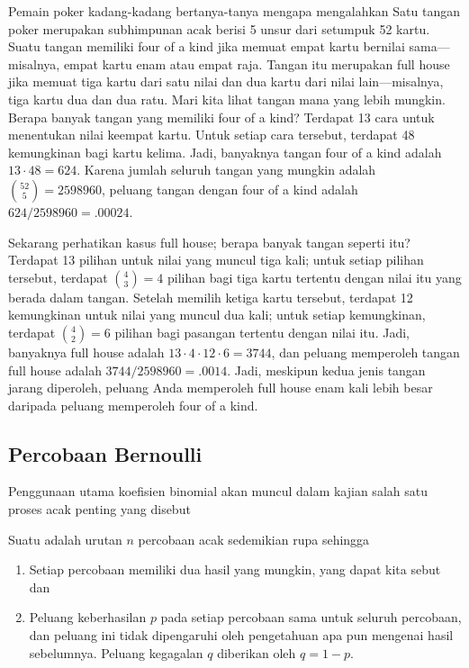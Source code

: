 \begin{example}\label{exam 3.8} Pemain poker kadang-kadang bertanya-tanya mengapa
 mengalahkan   Satu tangan poker merupakan
subhimpunan acak berisi 5 unsur dari setumpuk 52 kartu.  Suatu tangan memiliki four of
a kind jika memuat empat kartu bernilai sama---misalnya, empat kartu enam atau empat
raja.  Tangan itu merupakan full house jika memuat tiga kartu dari satu nilai dan dua
kartu dari nilai lain---misalnya, tiga kartu dua dan dua ratu.  Mari kita lihat tangan
mana yang lebih mungkin.  Berapa banyak tangan yang memiliki four of a kind?  Terdapat
13 cara untuk menentukan nilai keempat kartu.  Untuk setiap cara tersebut, terdapat
48 kemungkinan bagi kartu kelima.  Jadi, banyaknya tangan four of a kind adalah $13
\cdot 48 = 624$.  Karena jumlah seluruh tangan yang mungkin adalah ${52 \choose 5} =
2598960$, peluang tangan dengan four of a kind adalah $624/2598960 = .00024$.
\par
Sekarang perhatikan kasus full house; berapa banyak tangan seperti itu?  Terdapat 13
pilihan untuk nilai yang muncul tiga kali; untuk setiap pilihan tersebut, terdapat
${4 \choose 3} = 4$ pilihan bagi tiga kartu tertentu dengan nilai itu yang berada dalam
tangan.  Setelah memilih ketiga kartu tersebut, terdapat 12 kemungkinan untuk nilai
yang muncul dua kali; untuk setiap kemungkinan, terdapat ${4 \choose 2} = 6$ pilihan
bagi pasangan tertentu dengan nilai itu.  Jadi, banyaknya full house adalah $13 \cdot 4
\cdot 12 \cdot 6 = 3744$, dan peluang memperoleh tangan full house adalah
$3744/2598960 = .0014$.  Jadi, meskipun kedua jenis tangan jarang diperoleh, peluang
Anda memperoleh full house enam kali lebih besar daripada peluang memperoleh four of a kind.
\end{example}
\pagebreak[4]
\subsection*{Percobaan Bernoulli}

Penggunaan utama koefisien binomial akan muncul dalam kajian salah satu proses acak
penting yang disebut 

\begin{definition}\label{def 3.4} Suatu  adalah urutan
$n$ percobaan acak sedemikian rupa sehingga
\begin{enumerate}
\item Setiap percobaan memiliki dua hasil yang mungkin, yang dapat kita sebut
 dan 
\item Peluang keberhasilan $p$ pada setiap percobaan sama untuk seluruh percobaan, dan
peluang ini tidak dipengaruhi oleh pengetahuan apa pun mengenai hasil sebelumnya.
Peluang kegagalan $q$ diberikan oleh $q = 1 - p$.
\end{enumerate}
\end{definition}

